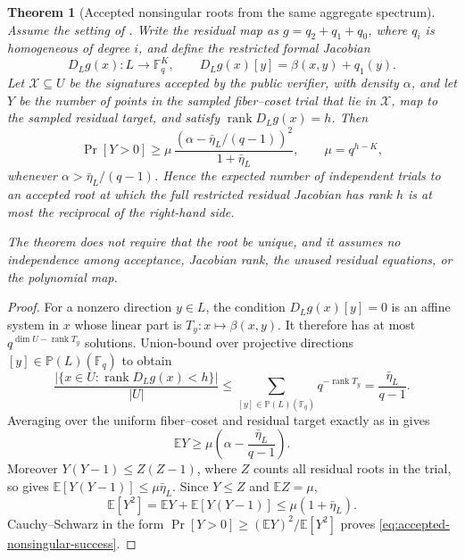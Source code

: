 \documentclass[11pt]{article}
\newtheorem{theorem}{Theorem}
\newcommand{\F}{\mathbb F}
\newcommand{\rank}{\operatorname{rank}}
\begin{document}
\begin{theorem}[Accepted nonsingular roots from the same aggregate spectrum]
\label{thm:accepted-nonsingular-roots}
Assume the setting of .  Write the residual map as
$g=q_2+q_1+q_0$, where $q_i$ is homogeneous of degree $i$, and define the
restricted formal Jacobian
\[
 D_Lg(x):L\longrightarrow\F_q^K,
 \qquad D_Lg(x)[y]=\beta(x,y)+q_1(y).
\]
Let $\mathcal X\subseteq U$ be the signatures accepted by the public verifier,
with density $\alpha$, and let $Y$ be the number of points in the sampled
fiber--coset trial that lie in $\mathcal X$, map to the sampled residual
target, and satisfy $\rank D_Lg(x)=h$.  Then
\begin{equation}\label{eq:accepted-nonsingular-success}
 \Pr[Y>0]
 \ge
 \mu\,
 \frac{\left(\alpha-\bar\eta_L/(q-1)\right)^2}
      {1+\bar\eta_L},
 \qquad \mu=q^{h-K},
\end{equation}
whenever $\alpha>\bar\eta_L/(q-1)$.  Hence the expected number of independent
trials to an accepted root at which the full restricted residual Jacobian has
rank $h$ is at most the reciprocal of the right-hand side.

The theorem does not require that the root be unique, and it assumes no
independence among acceptance, Jacobian rank, the unused residual equations,
or the polynomial map.
\end{theorem}

\begin{proof}
For a nonzero direction $y\in L$, the condition $D_Lg(x)[y]=0$ is an affine
system in $x$ whose linear part is $T_y:x\mapsto\beta(x,y)$.  It therefore has
at most $q^{\dim U-\rank T_y}$ solutions.  Union-bound over projective
directions $[y]\in\mathbb P(L)(\F_q)$ to obtain
\begin{equation}\label{eq:jacobian-defect-mass}
 \frac{|\{x\in U:\rank D_Lg(x)<h\}|}{|U|}
 \le \sum_{[y]\in\mathbb P(L)(\F_q)}q^{-\rank T_y}
 =\frac{\bar\eta_L}{q-1}.
\end{equation}
Averaging over the uniform fiber--coset and residual target exactly as in
 gives
\[
 \mathbb E Y\ge
 \mu\left(\alpha-\frac{\bar\eta_L}{q-1}\right).
\]
Moreover $Y(Y-1)\le Z(Z-1)$, where $Z$ counts all residual roots in the trial,
so  gives
$\mathbb E[Y(Y-1)]\le\mu\bar\eta_L$.  Since $Y\le Z$ and
$\mathbb E Z=\mu$,
\[
 \mathbb E[Y^2]
 =\mathbb E Y+\mathbb E[Y(Y-1)]
 \le \mu(1+\bar\eta_L).
\]
Cauchy--Schwarz in the form
$\Pr[Y>0]\ge(\mathbb EY)^2/\mathbb E[Y^2]$ proves
\eqref{eq:accepted-nonsingular-success}.
\end{proof}
\end{document}
